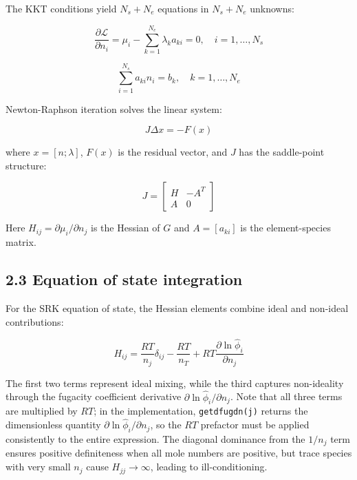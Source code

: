 \documentclass[review,3p]{elsarticle}
\begin{document}
The KKT conditions yield $N_s + N_e$ equations in $N_s + N_e$ unknowns:

\begin{equation}
\frac{\partial \mathcal{L}}{\partial n_i} = \mu_i - \sum_{k=1}^{N_e} \lambda_k a_{ki} = 0, \quad i = 1, \ldots, N_s
\end{equation}

\begin{equation}
\sum_{i=1}^{N_s} a_{ki} n_i = b_k, \quad k = 1, \ldots, N_e
\end{equation}

Newton-Raphson iteration solves the linear system:

\begin{equation}
J \Delta x = -F(x)
\end{equation}

where $x = [n; \lambda]$, $F(x)$ is the residual vector, and $J$ has the saddle-point structure:

\begin{equation}
J = \begin{bmatrix} H & -A^T \\ A & 0 \end{bmatrix}
\end{equation}

Here $H_{ij} = \partial \mu_i / \partial n_j$ is the Hessian of $G$ and $A = [a_{ki}]$ is the element-species matrix.

\subsection{2.3 Equation of state integration}

For the SRK equation of state, the Hessian elements combine ideal and non-ideal contributions:

\begin{equation}
H_{ij} = \frac{RT}{n_j}\delta_{ij} - \frac{RT}{n_T} + RT\frac{\partial \ln \hat{\phi}_i}{\partial n_j}
\end{equation}

The first two terms represent ideal mixing, while the third captures non-ideality through the fugacity coefficient derivative $\partial \ln \hat{\phi}_i / \partial n_j$. Note that all three terms are multiplied by $RT$; in the implementation, \texttt{getdfugdn(j)} returns the dimensionless quantity $\partial \ln \hat{\phi}_i / \partial n_j$, so the $RT$ prefactor must be applied consistently to the entire expression. The diagonal dominance from the $1/n_j$ term ensures positive definiteness when all mole numbers are positive, but trace species with very small $n_j$ cause $H_{jj} \to \infty$, leading to ill-conditioning.
\end{document}
